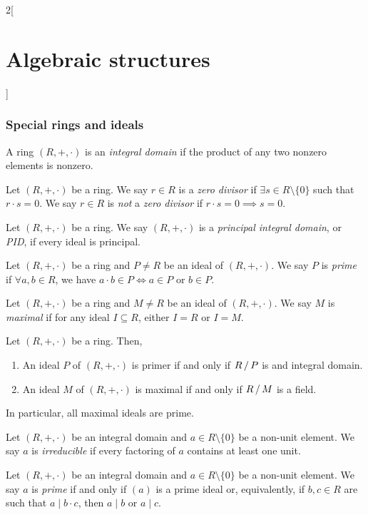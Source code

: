 \documentclass[../../../main.tex]{subfiles}
\begin{document}
\begin{multicols}{2}[\section{Algebraic structures}]
\subsubsection*{Special rings and ideals}
\begin{definition}
    A ring $(R,+,\cdot)$ is an \textit{integral domain} if the product of any two nonzero elements is nonzero.
\end{definition}
\begin{definition}
    Let $(R,+,\cdot)$ be a ring. We say $r\in R$ is a \textit{zero divisor} if $\exists s\in R\setminus\{0\}$ such that $r\cdot s=0$. We say $r\in R$ is \textit{not} a \textit{zero divisor} if $r\cdot s=0\implies s=0$. 
\end{definition}
\begin{definition}
    Let $(R,+,\cdot)$ be a ring. We say $(R,+,\cdot)$ is a \textit{principal integral domain}, or \textit{PID}, if every ideal is principal.
\end{definition}
\begin{definition}
    Let $(R,+,\cdot)$ be a ring and $P\ne R$ be an ideal of $(R,+,\cdot)$. We say $P$ is \textit{prime} if $\forall a,b\in R$, we have $a\cdot b\in P\iff a\in P\text{ or }b\in P$.
\end{definition}
\begin{definition}
    Let $(R,+,\cdot)$ be a ring and $M\ne R$ be an ideal of $(R,+,\cdot)$. We say $M$ is \textit{maximal} if for any ideal $I\subseteq R$, either $I=R$ or $I=M$.
\end{definition}
\begin{prop}
    Let $(R,+,\cdot)$ be a ring. Then,
    \begin{enumerate}
        \item An ideal $P$ of $(R,+,\cdot)$ is primer if and only if $\quot{R}{P}$ is and integral domain.
        \item An ideal $M$ of $(R,+,\cdot)$ is maximal if and only if $\quot{R}{M}$ is a field.
    \end{enumerate}
    In particular, all maximal ideals are prime.
\end{prop}
\begin{definition}
    Let $(R,+,\cdot)$ be an integral domain and $a\in R\setminus\{0\}$ be a non-unit element. We say $a$ is \textit{irreducible} if every factoring of $a$ contains at least one unit. 
\end{definition}
\begin{definition}
    Let $(R,+,\cdot)$ be an integral domain and $a\in R\setminus\{0\}$ be a non-unit element. We say $a$ is \textit{prime} if and only if $(a)$ is a prime ideal or, equivalently, if $b,c\in R$ are such that $a\mid b\cdot c$, then $a\mid b$ or $a\mid c$. 

\end{definition}
\end{multicols}
\end{document}
